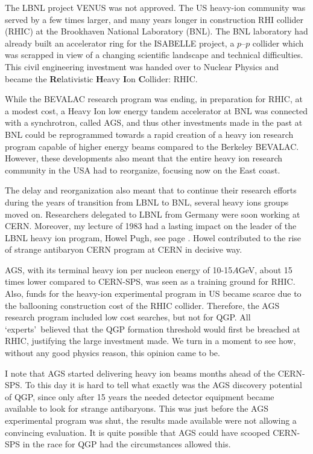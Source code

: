 The LBNL project VENUS was not approved. The US heavy-ion community was served by a few times larger, and many years longer in construction RHI collider (RHIC) at the Brookhaven National Laboratory (BNL). The BNL laboratory had already built an accelerator ring for the ISABELLE project, a $p$--$p$ collider which was scrapped in view of a changing scientific landscape and technical difficulties. This civil engineering investment was handed over to Nuclear Physics and became the {\bf Re}lativistic {\bf H}eavy {\bf I}on {\bf C}ollider: RHIC. 

While the BEVALAC research program was ending, in preparation for RHIC, at a modest cost, a Heavy Ion low energy tandem accelerator at BNL was connected with a synchrotron, called AGS, and thus other investments made in the past at BNL could be reprogrammed towards a rapid creation of a heavy ion research program capable of higher energy beams compared to the Berkeley BEVALAC. However, these developments also meant that the entire heavy ion research community in the USA had to reorganize, focusing now on the East coast. 

The delay and reorganization also meant that to continue their research efforts during the years of transition from LBNL to BNL, several heavy ions groups moved on. Researchers delegated to LBNL from Germany were soon working at CERN. Moreover, my lecture of 1983 had a lasting impact on the leader of the LBNL heavy ion program, Howel Pugh, see page \pageref{Pugh}. Howel contributed to the rise of strange antibaryon CERN program at CERN in decisive way.

AGS, with its terminal heavy ion per nucleon energy of 10-15$A$\;GeV, about 15 times lower compared to CERN-SPS, was seen as a training ground for RHIC. Also, funds for the heavy-ion experimental program in US became scarce due to the ballooning construction cost of the RHIC collider. Therefore, the AGS research program included low cost searches, but not for QGP. All \lq experts\rq\ believed that the QGP formation threshold would first be breached at RHIC, justifying the large investment made. We turn in a moment to see how, without any good physics reason, this opinion came to be.

I note that AGS started delivering heavy ion beams months ahead of the CERN-SPS. To this day it is hard to tell what exactly was the AGS discovery potential of QGP, since only after 15 years the needed detector equipment became available to look for strange antibaryons. This was just before the AGS experimental program was shut, the results made available were not allowing a convincing evaluation. It is quite possible that AGS could have scooped CERN-SPS in the race for QGP had the circumstances allowed this.

